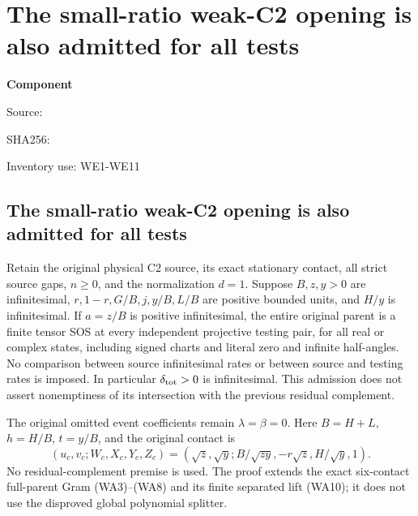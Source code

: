 \chapter{The small-ratio weak-C2 opening is also admitted for all tests}
\label{component:p296e824cb97a}
\noindent\textbf{Component }\par
{\small\noindent Source: \par}
{\small\noindent SHA256: \par}
{\small\noindent Inventory use: WE1-WE11\par}
\medskip
\section{The small-ratio weak-C2 opening is also admitted for all tests}
\label{p296e824cb97a:sec:r10-weak-boundary}

\begin{theorem}
Retain the original physical C2 source, its exact stationary contact,
all strict source gaps, $n\ge0$, and the normalization $d=1$.
Suppose $B,z,y>0$ are infinitesimal,
$r,1-r,G/B,j,y/B,L/B$ are positive bounded units, and $H/y$ is
infinitesimal. If $a=z/B$ is positive infinitesimal, the entire
original parent is a finite tensor SOS at every independent
projective testing pair, for all real or complex states, including
signed charts and literal zero and infinite half-angles.
No comparison between source infinitesimal rates or between source
and testing rates is imposed. In particular $\delta_{\rm tot}>0$
is infinitesimal. This admission does not assert nonemptiness of
its intersection with the previous residual complement.
\end{theorem}

The original omitted event coefficients remain $\lambda=\beta=0$.
Here $B=H+L$, $h=H/B$, $t=y/B$, and the original contact is
\[
 (u_c,v_c;W_c,X_c,Y_c,Z_c)
 =\left(\sqrt z,\sqrt y;B/\sqrt{zy},-r\sqrt z,H/\sqrt y,1\right).
\]
No residual-complement premise is used. The proof extends the exact
six-contact full-parent Gram (WA3)--(WA8) and its finite separated
lift (WA10); it does not use the disproved global polynomial splitter.

